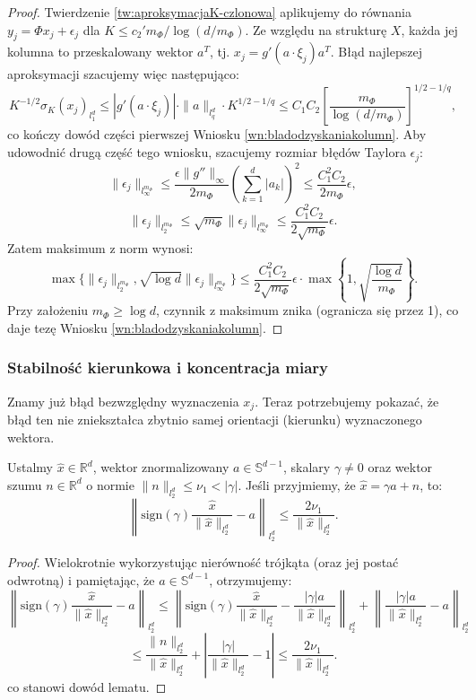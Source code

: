 \begin{proof}
Twierdzenie \ref{tw:aproksymacjaK-czlonowa} aplikujemy do równania $y_j = \Phi x_j + \epsilon_j$ dla $K \le c_2' m_\Phi / \log(d/m_\Phi)$. Ze względu na strukturę $X$, każda jej kolumna to przeskalowany wektor $a^T$, tj. $x_j = g'(a \cdot \xi_j)a^T$. Błąd najlepszej aproksymacji szacujemy więc następująco:
$$K^{-1/2}\sigma_K(x_j)_{l_1^d} \le |g'(a \cdot \xi_j)| \cdot \|a\|_{l_q^d} \cdot K^{1/2 - 1/q} \le C_1 C_2 \left[\frac{m_\Phi}{\log(d/m_\Phi)}\right]^{1/2 - 1/q},$$ 
co kończy dowód części pierwszej Wniosku \ref{wn:bladodzyskaniakolumn}.
Aby udowodnić drugą część tego wniosku, szacujemy rozmiar błędów Taylora $\epsilon_j$:
$$\|\epsilon_j\|_{l_\infty^{m_\Phi}} \le \frac{\epsilon \|g''\|_\infty}{2m_\Phi} \left(\sum_{k=1}^d |a_k|\right)^2 \le \frac{C_1^2 C_2}{2m_\Phi} \epsilon,$$ 
$$\|\epsilon_j\|_{l_2^{m_\Phi}} \le \sqrt{m_\Phi} \|\epsilon_j\|_{l_\infty^{m_\Phi}} \le \frac{C_1^2 C_2}{2\sqrt{m_\Phi}} \epsilon.$$ 
Zatem maksimum z norm wynosi:
$$\max\{\|\epsilon_j\|_{l_2^{m_\Phi}}, \sqrt{\log d}\|\epsilon_j\|_{l_\infty^{m_\Phi}}\} \le \frac{C_1^2 C_2}{2\sqrt{m_\Phi}}\epsilon \cdot \max\left\{1, \sqrt{\frac{\log d}{m_\Phi}}\right\}.$$ 
Przy założeniu $m_\Phi \ge \log d$, czynnik z maksimum znika (ogranicza się przez 1), co daje tezę Wniosku \ref{wn:bladodzyskaniakolumn}. 
\end{proof}


\subsubsection{Stabilność kierunkowa i koncentracja miary}

Znamy już błąd bezwzględny wyznaczenia $x_j$. Teraz potrzebujemy pokazać, że błąd ten nie zniekształca zbytnio samej orientacji (kierunku) wyznaczonego wektora.

\begin{lm}\label{lm:stabilnoscpodprzestrzenijednowymiarowy}
Ustalmy $\hat{x} \in \mathbb{R}^d$, wektor znormalizowany $a \in \mathbb{S}^{d-1}$, skalary $\gamma \neq 0$ oraz wektor szumu $n \in \mathbb{R}^d$ o normie $\|n\|_{l_2^d} \le \nu_1 < |\gamma|$. Jeśli przyjmiemy, że $\hat{x} = \gamma a + n$, to:
$$\left\| \text{sign}(\gamma)\frac{\hat{x}}{\|\hat{x}\|_{l_2^d}} - a \right\|_{l_2^d} \le \frac{2\nu_1}{\|\hat{x}\|_{l_2^d}}.$$ 
\end{lm}

\begin{proof}
Wielokrotnie wykorzystując nierówność trójkąta (oraz jej postać odwrotną) i pamiętając, że $a \in \mathbb{S}^{d-1}$, otrzymujemy:
$$\left\| \text{sign}(\gamma)\frac{\hat{x}}{\|\hat{x}\|_{l_2^d}} - a \right\|_{l_2^d} \le \left\| \text{sign}(\gamma)\frac{\hat{x}}{\|\hat{x}\|_{l_2^d}} - \frac{|\gamma|a}{\|\hat{x}\|_{l_2^d}} \right\|_{l_2^d} + \left\| \frac{|\gamma|a}{\|\hat{x}\|_{l_2^d}} - a \right\|_{l_2^d}$$ 
$$\le \frac{\|n\|_{l_2^d}}{\|\hat{x}\|_{l_2^d}} + \left| \frac{|\gamma|}{\|\hat{x}\|_{l_2^d}} - 1 \right| \le \frac{2\nu_1}{\|\hat{x}\|_{l_2^d}}.$$ 
co stanowi dowód lematu.
\end{proof}

